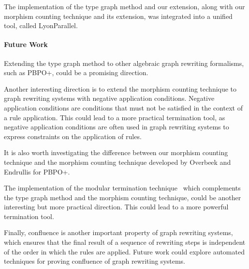 \documentclass{report}
\begin{document}
The implementation of the type graph method and our extension, along with our morphism counting technique and its extension, was integrated into a unified tool, called LyonParallel.
 
\paragraph{Future Work}

Extending the type graph method to other algebraic graph rewriting formalisms, such as PBPO+, could be a promising direction.

Another interesting direction is to extend the morphism counting technique to graph rewriting systems with negative application conditions. Negative application conditions are conditions that must not be satisfied in the context of a rule application. This could lead to a more practical termination tool, as negative application conditions are often used in graph rewriting systems to express constraints on the application of rules.

It is also worth investigating the difference between our morphism counting technique and
 the morphism counting technique developed by Overbeek and Endrullis for PBPO+. 
 
The implementation of the modular termination technique~\cite{plump2018modular} which complements the type graph method and the morphism counting technique, could be another interesting but more practical direction. This could lead to a more powerful termination tool.
   
Finally, confluence is another important property of graph rewriting systems, which ensures that the final result of a sequence of rewriting steps is independent of the order in which the rules are applied. Future work could explore automated techniques for proving confluence of graph rewriting systems.

\printbibliography
\end{document}
